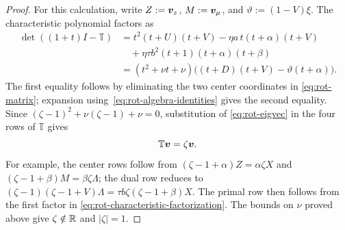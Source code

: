 \begin{proof}
For this calculation, write \(Z:=\bm{v}_z\), \(M:=\bm{v}_\mu\), and
\(\vartheta:=(1-V)\xi\). The characteristic polynomial factors as
\begin{equation}
\label{eq:rot-characteristic-factorization}
\begin{aligned}
\det((1+t)I-\mathbb T)
&=t^2(t+U)(t+V)-\eta a\,t(t+\alpha)(t+V)\\
&\quad+\eta\tau b^2(t+1)(t+\alpha)(t+\beta)\\
&=(t^2+\nu t+\nu)
  \bigl((t+D)(t+V)-\vartheta(t+\alpha)\bigr).
\end{aligned}
\end{equation}
The first equality follows by eliminating the two center coordinates in
\eqref{eq:rot-matrix}; expansion using~\eqref{eq:rot-algebra-identities}
gives the second equality. Since
\((\zeta-1)^2+\nu(\zeta-1)+\nu=0\), substitution of
\eqref{eq:rot-eigvec} in the four rows of \(\mathbb T\) gives
\[
\mathbb T\bm{v}=\zeta\bm{v}.
\]
For example, the center rows follow from
\((\zeta-1+\alpha)Z=\alpha\zeta X\) and
\((\zeta-1+\beta)M=\beta\zeta\Lambda\); the dual row reduces to
\((\zeta-1)(\zeta-1+V)\Lambda
=\tau b\zeta(\zeta-1+\beta)X\).
The primal row then follows from the first factor in
\eqref{eq:rot-characteristic-factorization}. The bounds on \(\nu\)
proved above give \(\zeta\notin\mathbb{R}\) and \(|\zeta|=1\).


\end{proof}
